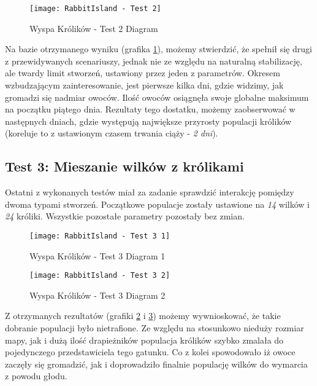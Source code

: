 \begin{figure}
	\texttt{[image: RabbitIsland - Test 2]}
	\label{fig:rabbitIslandTest2Diagram1}
	\caption{Wyspa Królików - Test 2 Diagram}
\end{figure}

\par Na bazie otrzymanego wyniku (grafika \ref{fig:rabbitIslandTest2Diagram1}), możemy stwierdzić, że spełnił się drugi z przewidywanych scenariuszy, jednak nie ze względu na naturalną stabilizację, ale twardy limit stworzeń, ustawiony przez jeden z parametrów. Okresem wzbudzającym zainteresowanie, jest pierwsze kilka dni, gdzie widzimy, jak gromadzi się nadmiar owoców. Ilość owoców osiągnęła swoje globalne maksimum na początku piątego dnia. Rezultaty tego dostatku, możemy zaobserwować w następnych dniach, gdzie występują największe przyrosty populacji królików (koreluje to z ustawionym czasem trwania ciąży - \emph{2 dni}).

\subsection{Test 3: Mieszanie wilków z królikami}

\par Ostatni z wykonanych testów miał za zadanie sprawdzić interakcję pomiędzy dwoma typami stworzeń. Początkowe populacje zostały ustawione na \emph{14} wilków i \emph{24} króliki. Wszystkie pozostałe parametry pozostały bez zmian.

\begin{figure}
	\texttt{[image: RabbitIsland - Test 3 1]}
	\label{fig:rabbitIslandTest3Diagram1}
	\caption{Wyspa Królików - Test 3 Diagram 1}
\end{figure}

\begin{figure}
	\texttt{[image: RabbitIsland - Test 3 2]}
	\label{fig:rabbitIslandTest3Diagram2}
	\caption{Wyspa Królików - Test 3 Diagram 2}
\end{figure}

\par Z otrzymanych rezultatów (grafiki \ref{fig:rabbitIslandTest3Diagram1} i \ref{fig:rabbitIslandTest3Diagram2}) możemy wywnioskować, że takie dobranie populacji było nietrafione. Ze względu na stosunkowo nieduży rozmiar mapy, jak i dużą ilość drapieżników populacja królików szybko zmalała do pojedynczego przedstawiciela tego gatunku. Co z kolei spowodowało iż owoce zaczęły się gromadzić, jak i doprowadziło finalnie populację wilków do wymarcia z powodu głodu.

